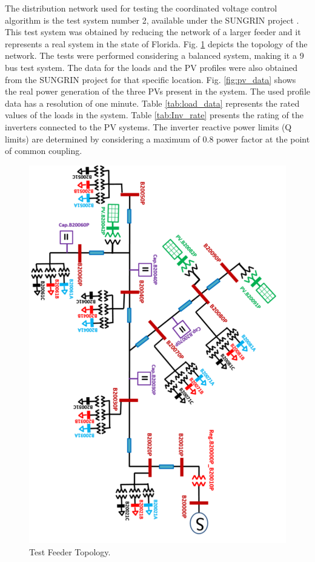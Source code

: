 The distribution network used for testing the coordinated voltage control algorithm is the test system number 2, available under the SUNGRIN project \cite{SG}. This test system was obtained by reducing the network of a larger feeder and it represents a real system in the state of Florida. Fig. \ref{fig:Feeder2} \cite{SG} depicts the topology of the network. The tests were performed considering a balanced system, making it a 9 bus test system. The data for the loads and the PV profiles were also obtained from the SUNGRIN project for that specific location. Fig. \ref{fig:pv_data} shows the real power generation of the three PVs present in the system. The used profile data has a resolution of one minute. Table \ref{tab:load_data} represents the rated values of the loads in the system. Table \ref{tab:Inv_rate} presents the rating of the inverters connected to the PV systems. The inverter reactive power limits (Q limits) are determined by considering a maximum of 0.8 power factor at the point of common coupling. 

\begin{figure}[!h]
\centering
\includegraphics[width=\linewidth]{figs/feeder_r.png}
\caption{Test Feeder Topology.}
\label{fig:Feeder2}
\end{figure}

